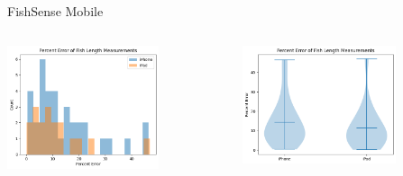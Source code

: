 \begin{frame}{FishSense Mobile}
     \begin{columns}
         \begin{column}{0.5\textwidth}
             \centering
             \includegraphics[height=0.7\textheight,width=0.7\textwidth,keepaspectratio]{images/fs_hist.png}
         \end{column}
         \begin{column}{0.5\textwidth}
             \centering
             \includegraphics[height=0.7\textheight,width=0.7\textwidth,keepaspectratio]{images/fs_violin.png}
         \end{column}
     \end{columns}
\end{frame}

